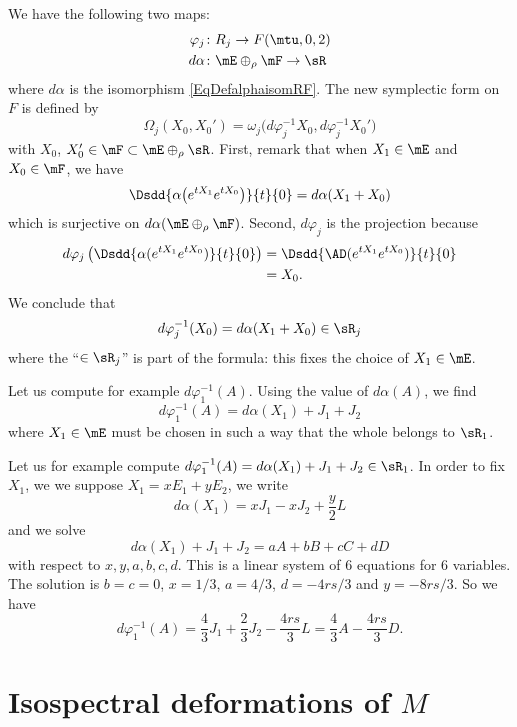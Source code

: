 We have the following two maps:
\[
	\begin{split}
		\varphi_j&\colon R_j\to F(\mtu,0,2)\\
		d\alpha&\colon \mE\oplus_{\rho}\mF\to \sR
	\end{split}
\]
where $d\alpha$ is the isomorphism \eqref{EqDefalphaisomRF}.
The new symplectic form on $F$ is defined by
\begin{equation}
	\Omega_{j}(X_0,X_0')=\omega_{j}\big( d\varphi_j^{-1}X_0,d\varphi_j^{-1}X_0' \big)
\end{equation}
with $X_0$, $X_0'\in\mF\subset\mE\oplus_{\rho}\sR$. First, remark that when $X_1\in\mE$ and $X_0\in\mF$, we have
\begin{equation}
	\Dsdd{ \alpha\big(  e^{tX_1} e^{tX_0} \big) }{t}{0}=d\alpha(X_1+X_0)
\end{equation}
which is surjective on $d\alpha(\mE\oplus_{\rho}\mF)$. Second, $d\varphi_j$ is the projection because
\begin{align*}
	d\varphi_j\left( \Dsdd{ \alpha( e^{tX_1} e^{tX_0}) }{t}{0} \right) & =\Dsdd{ \AD( e^{tX_1} e^{tX_0}) }{t}{0} \\
	                                                                   & =X_0.
\end{align*}
We conclude that
\[
	d\varphi_j^{-1}(X_0)=d\alpha(X_1+X_0)\in\sR_j
\]
where the ``$\in\sR_j$'' is part of the formula: this fixes the choice of $X_1\in\mE$.


Let us compute for example $d\varphi_1^{-1}(A)$. Using the value of $d\alpha(A)$, we find
\[
	d\varphi_1^{-1}(A)=d\alpha(X_1)+J_{1}+J_{2}
\]
where $X_1\in\mE$ must be chosen in such a way that the whole belongs to $\sR_{1}$.

Let us for example compute $d\varphi^{-1}_{1}(A)=d\alpha(X_1)+J_{1}+J_{2}\in\sR_{1}$. In order to fix $X_1$, we we suppose $X_1=xE_{1}+yE_{2}$, we write
\[
	d\alpha(X_1)=xJ_{1}-xJ_{2}+\frac{ y }{2}L
\]
and we solve
\[
	d\alpha(X_1)+J_{1}+J_{2}=aA+bB+cC+dD
\]
with respect to $x,y,a,b,c,d$. This is a linear system of $6$ equations for $6$ variables. The solution is $b=c=0$, $x=1/3$, $a=4/3$, $d=-4rs/3$ and $y=-8rs/3$. So we have
\begin{equation}
	d\varphi_{1}^{-1}(A)=\frac{ 4 }{ 3 }J_{1}+\frac{ 2 }{ 3 }J_{2}-\frac{ 4rs }{ 3 }L=\frac{ 4 }{ 3 }A-\frac{ 4rs }{ 3 }D.
\end{equation}


\section{Isospectral deformations of \texorpdfstring{$M$}{M}}

